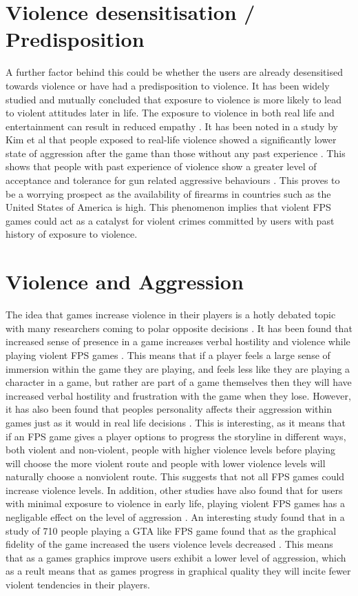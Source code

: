 \documentclass{scrartcl}
\begin{document}
\section {Violence desensitisation / Predisposition}
A further factor behind this could be whether the users are already desensitised towards violence or have had a predisposition to violence. It has been widely studied and mutually concluded that exposure to violence is more likely to lead to violent attitudes later in life. The exposure to violence in both real life and entertainment can result in reduced empathy \cite{kim2011effects}. It has been noted in a study by Kim et al that people exposed to real-life violence showed a significantly lower state of aggression after the game than those without any past experience \cite{kim2011effects}. This shows that people with past experience of violence show a greater level of acceptance and tolerance for gun related aggressive behaviours \cite{kim2011effects}. This proves to be a worrying prospect as the availability of firearms in countries such as the United States of America is high. This phenomenon implies that violent FPS games could act as a catalyst for violent crimes committed by users with past history of exposure to violence.

\section{Violence and Aggression}
The idea that games increase violence in their players is a hotly debated topic with many researchers coming to polar opposite decisions \cite {zhang2009violent}. It has been found that increased sense of presence in a game increases verbal hostility and violence while playing violent FPS games \cite{nowak2008causes}. This means that if a player feels a large sense of immersion within the game they are playing, and feels less like they are playing a character in a game, but rather are part of a game themselves then they will have increased verbal hostility and frustration with the game when they lose. However, it has also been found that peoples personality affects their aggression within games just as it would in real life decisions \cite{murzyn2016our}. This is interesting, as it means that if an FPS game gives a player options to progress the storyline in different ways, both violent and non-violent, people with higher violence levels before playing will choose the more violent route and people with lower violence levels will naturally choose a nonviolent route. This suggests that not all FPS games could increase violence levels. In addition, other studies have also found that for users with minimal exposure to violence in early life, playing violent FPS games has a negligable effect on the level of aggression \cite{fumhe2015violent}. An interesting study found that in a study of 710 people playing a GTA like FPS game found that as the graphical fidelity of the game increased the users violence levels decreased \cite{zendle2015higher}. This means that as a games graphics improve users exhibit a lower level of aggression, which as a reult means that as games progress in graphical quality they will incite fewer violent tendencies in their players.
\end{document}
